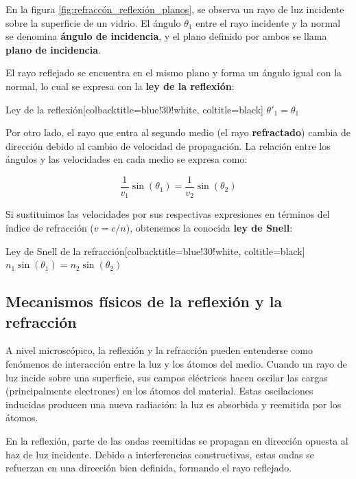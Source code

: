 En la figura \ref{fig:refraccón_reflexión_planos}, se observa un rayo de luz incidente sobre la superficie de un vidrio. El ángulo $\theta_1$ entre el rayo incidente y la normal se denomina \textbf{ángulo de incidencia}, y el plano definido por ambos se llama \textbf{plano de incidencia}.

El rayo reflejado se encuentra en el mismo plano y forma un ángulo igual con la normal, lo cual se expresa con la \textbf{ley de la reflexión}:

\begin{mybox}[blue]{Ley de la reflexión}[colbacktitle=blue!30!white, coltitle=black]
	$\theta'_1 = \theta_1$
\end{mybox}

Por otro lado, el rayo que entra al segundo medio (el rayo \textbf{refractado}) cambia de dirección debido al cambio de velocidad de propagación. La relación entre los ángulos y las velocidades en cada medio se expresa como:

\begin{equation}
	\frac{1}{v_1} \sin(\theta_1) = \frac{1}{v_2} \sin(\theta_2)
	\label{eq:refraccion_dos_medios}
\end{equation}

Si sustituimos las velocidades por sus respectivas expresiones en términos del índice de refracción ($v = c/n$), obtenemos la conocida \textbf{ley de Snell}:

\begin{mybox}[blue]{Ley de Snell de la refracción}[colbacktitle=blue!30!white, coltitle=black]
	$n_1 \sin(\theta_1) = n_2 \sin(\theta_2)$
\end{mybox} 

\subsection{Mecanismos físicos de la reflexión y la refracción}

A nivel microscópico, la reflexión y la refracción pueden entenderse como fenómenos de interacción entre la luz y los átomos del medio. Cuando un rayo de luz incide sobre una superficie, sus campos eléctricos hacen oscilar las cargas (principalmente electrones) en los átomos del material. Estas oscilaciones inducidas producen una nueva radiación: la luz es absorbida y reemitida por los átomos.

En la reflexión, parte de las ondas reemitidas se propagan en dirección opuesta al haz de luz incidente. Debido a interferencias constructivas, estas ondas se refuerzan en una dirección bien definida, formando el rayo reflejado.


